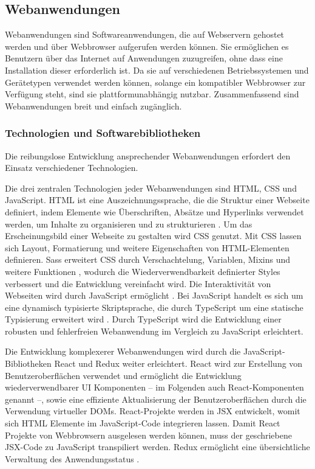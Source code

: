 \subsection{Webanwendungen}
Webanwendungen sind Softwareanwendungen, die auf Webservern gehostet werden und über Webbrowser aufgerufen werden können. Sie ermöglichen es Benutzern über das Internet auf Anwendungen zuzugreifen, ohne dass eine Installation dieser erforderlich ist. Da sie auf verschiedenen Betriebssystemen und Gerätetypen verwendet werden können, solange ein kompatibler Webbrowser zur Verfügung steht, sind sie plattformunabhängig nutzbar.\cite[Abschnitt~1-2]{AWSWebApp} Zusammenfassend sind Webanwendungen breit und einfach zugänglich.

\subsubsection{Technologien und Softwarebibliotheken}\label{sec:WebTechnologies}
Die reibungslose Entwicklung ansprechender Webanwendungen erfordert den Einsatz verschiedener Technologien.

Die drei zentralen Technologien jeder Webanwendungen sind \ac{HTML}, \ac{CSS} und JavaScript. \ac{HTML} ist eine Auszeichnungssprache, die die Struktur einer Webseite definiert, indem Elemente wie Überschriften, Absätze und Hyperlinks verwendet werden, um Inhalte zu organisieren und zu strukturieren \cite{HTML}. Um das Erscheinungsbild einer Webseite zu gestalten wird \ac{CSS} genutzt. Mit \ac{CSS} lassen sich Layout, Formatierung und weitere Eigenschaften von \ac{HTML}-Elementen definieren.\cite{CSS} \ac{Sass} erweitert \ac{CSS} durch Verschachtelung, Variablen, \gls{Mixins} und weitere Funktionen \cite{Sass}, wodurch die Wiederverwendbarkeit definierter Styles verbessert und die Entwicklung vereinfacht wird. Die Interaktivität von Webseiten wird durch JavaScript ermöglicht \cite{JavaScript}. Bei JavaScript handelt es sich um eine dynamisch typisierte Skriptsprache, die durch TypeScript um eine statische Typisierung erweitert wird \cite{TypeScript}. Durch TypeScript wird die Entwicklung einer robusten und fehlerfreien Webanwendung im Vergleich zu JavaScript erleichtert.

Die Entwicklung komplexerer Webanwendungen wird durch die JavaScript-Bibliotheken React und Redux weiter erleichtert. React wird zur Erstellung von Benutzeroberflächen verwendet und ermöglicht die Entwicklung wiederverwendbarer \ac{UI} Komponenten – im Folgenden auch React-Komponenten genannt –, sowie eine effiziente Aktualisierung der Benutzeroberflächen durch die Verwendung virtueller \gls{DOM}s. React-Projekte werden in \ac{JSX} entwickelt, womit sich \ac{HTML} Elemente im JavaScript-Code integrieren lassen. Damit React Projekte von Webbrowsern ausgelesen werden können, muss der geschriebene \ac{JSX}-Code zu JavaScript transpiliert werden.\cite{React} Redux ermöglicht eine übersichtliche Verwaltung des Anwendungsstatus \cite{Redux}.

